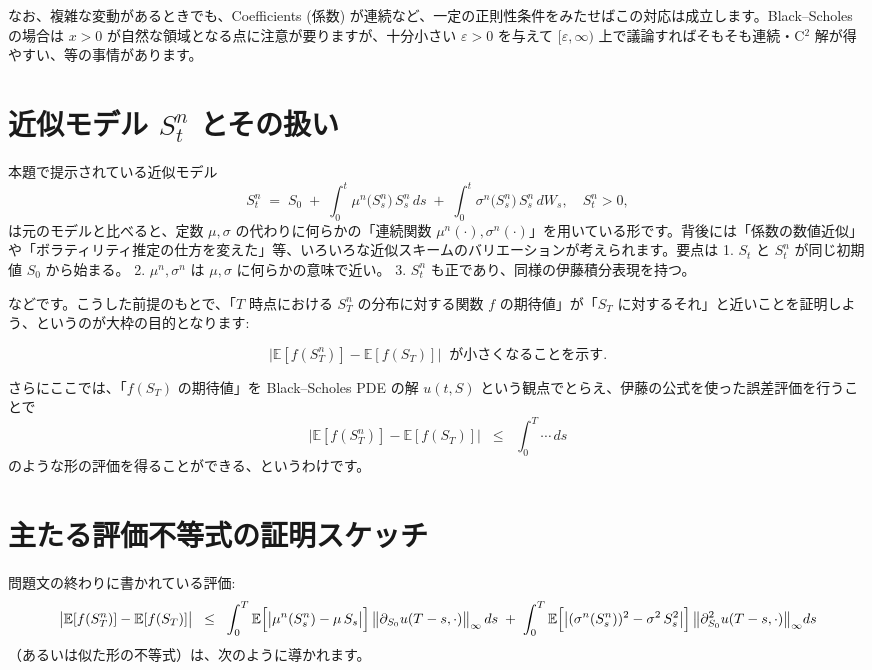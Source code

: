 \documentclass[a4paper]{jsarticle}
\begin{document}
なお、複雑な変動があるときでも、Coefficients (係数) が連続など、一定の正則性条件をみたせばこの対応は成立します。Black--Scholes の場合は $x>0$ が自然な領域となる点に注意が要りますが、十分小さい $\varepsilon>0$ を与えて $[\varepsilon,\infty)$ 上で議論すればそもそも連続・C${}^2$ 解が得やすい、等の事情があります。  

\vspace{5mm}  

\section{近似モデル $S_t^n$ とその扱い}  

本題で提示されている近似モデル  
\[  
  S_t^n  
  \;=\;  
  S_0   
  \;+\;  
  \int_0^t \mu^n\bigl(S_s^n\bigr)\,S_s^n\,ds  
  \;+\;  
  \int_0^t \sigma^n\bigl(S_s^n\bigr)\,S_s^n\,dW_s,  
  \quad S_t^n > 0,  
\]  
は元のモデルと比べると、定数 $\mu,\sigma$ の代わりに何らかの「連続関数 $\mu^n(\cdot), \sigma^n(\cdot)$」を用いている形です。背後には「係数の数値近似」や「ボラティリティ推定の仕方を変えた」等、いろいろな近似スキームのバリエーションが考えられます。要点は  
1. $S_t$ と $S_t^n$ が同じ初期値 $S_0$ から始まる。  
2. $\mu^n, \sigma^n$ は $\mu, \sigma$ に何らかの意味で近い。  
3. $S_t^n$ も正であり、同様の伊藤積分表現を持つ。  

などです。こうした前提のもとで、「$T$ 時点における $S_T^n$ の分布に対する関数 $f$ の期待値」が「$S_T$ に対するそれ」と近いことを証明しよう、というのが大枠の目的となります:  

\[  
  \bigl|\mathbb{E}[f(S_T^n)] - \mathbb{E}[f(S_T)]\bigr|  
  \;\;\text{が小さくなることを示す}.  
\]  

さらにここでは、「$f(S_T)$ の期待値」を Black--Scholes PDE の解 $u(t,S)$ という観点でとらえ、伊藤の公式を使った誤差評価を行うことで  
\[  
  \bigl|\mathbb{E}[f(S_T^n)] - \mathbb{E}[f(S_T)]\bigr|  
  \;\;\le\;\;  
  \int_0^T \cdots \,ds  
\]  
のような形の評価を得ることができる、というわけです。  

\vspace{5mm}  

\section{主たる評価不等式の証明スケッチ}  

問題文の終わりに書かれている評価:  
\[  
  \bigl|\mathbb{E}[f(S_T^n)] - \mathbb{E}[f(S_T)]\bigr|  
  \;\;\le\;\;  
  \int_0^T   
    \mathbb{E}\Bigl[\bigl|\mu^n(S_s^n) - \mu\,S_s\bigr|\Bigr]\,  
    \bigl\|\partial_{S_0}u(T-s,\cdot)\bigr\|_\infty\,  
  ds  
  \;+\;  
  \int_0^T  
    \mathbb{E}\Bigl[  
      \bigl|(\sigma^n(S_s^n))^2 - \sigma^2\,S_s^2\bigr|  
    \Bigr]\,  
    \bigl\|\partial_{S_0}^2 u(T-s,\cdot)\bigr\|_\infty  
  ds  
\]  
（あるいは似た形の不等式）は、次のように導かれます。  
\end{document}
